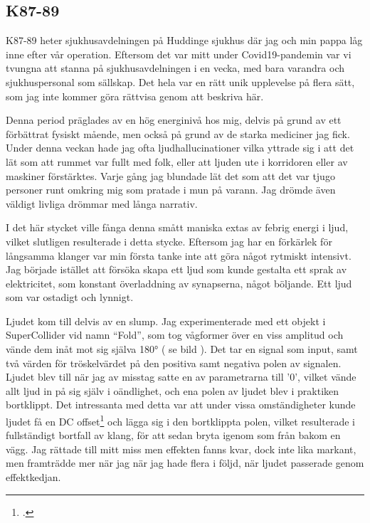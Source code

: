 \documentclass{article}
\begin{document}
\subsection{K87-89}
K87-89 heter sjukhusavdelningen på Huddinge sjukhus där jag och min pappa låg inne efter vår operation. 
Eftersom det var mitt under Covid19-pandemin var vi tvungna att stanna på sjukhusavdelningen i en vecka, med bara
varandra och sjukhuspersonal som sällskap. Det hela var en rätt unik upplevelse på flera sätt, som jag inte
kommer göra rättvisa genom att beskriva här. 

Denna period präglades av en hög energinivå hos mig, delvis på grund av ett förbättrat fysiskt mående, men
också på grund av de starka mediciner jag fick. Under denna veckan hade jag ofta ljudhallucinationer vilka
yttrade sig i att det lät som att rummet var fullt med folk, eller att ljuden ute i korridoren eller av
maskiner förstärktes. Varje gång jag blundade lät det som att det var tjugo personer runt omkring mig som
pratade i mun på varann. Jag drömde även väldigt livliga drömmar med långa narrativ. 

I det här stycket ville fånga denna smått maniska extas av febrig energi i ljud, vilket slutligen resulterade
i detta stycke. Eftersom jag har en förkärlek för långsamma klanger var min första tanke inte att göra något
rytmiskt intensivt. Jag började istället att försöka skapa ett ljud som kunde gestalta ett sprak av
elektricitet, som konstant överladdning av synapserna, något böljande. Ett ljud som var ostadigt och lynnigt.

Ljudet kom till delvis av en slump. Jag experimenterade med ett objekt i SuperCollider vid namn ``Fold'', som
tog vågformer över en viss amplitud och vände dem inåt mot sig själva 180° ( se bild ). Det tar en signal som
input, samt två värden för tröskelvärdet på den positiva samt negativa polen av signalen. Ljudet blev till när
jag av misstag satte en av parametrarna till '0', vilket vände allt ljud in på sig själv i oändlighet, och ena
polen av ljudet blev i praktiken bortklippt. Det intressanta med detta var att under vissa omständigheter
kunde ljudet få en DC offset\footcite{dc} och lägga sig i den
bortklippta polen, vilket resulterade i fullständigt bortfall av klang, för att sedan bryta igenom som från
bakom en vägg. Jag rättade till mitt miss men effekten fanns kvar, dock inte lika markant, men framträdde mer
när jag när jag hade flera i följd, när ljudet passerade genom effektkedjan.
\end{document}
